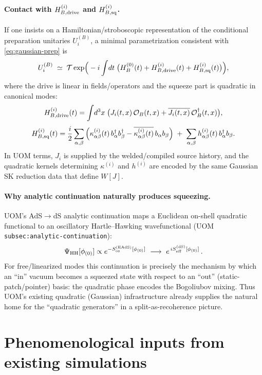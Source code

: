 \documentclass[11pt]{article}
\theoremstyle{definition}
\theoremstyle{plain}
\theoremstyle{remark}
\begin{document}
\paragraph{Contact with $H^{(i)}_{B,{\rm drive}}$ and $H^{(i)}_{B,{\rm sq}}$.}
If one insists on a Hamiltonian/stroboscopic representation of the conditional preparation unitaries $U_i^{(B)}$, a
minimal parametrization consistent with \eqref{eq:gaussian-prep} is
\begin{equation}
U_i^{(B)}
\;\simeq\;
\mathcal T\exp\!\Big(-i\int\!dt\;\big(H^{(0)}_B(t)+H^{(i)}_{B,{\rm drive}}(t)+H^{(i)}_{B,{\rm sq}}(t)\big)\Big),
\label{eq:HB-drive-sq}
\end{equation}
where the drive is linear in fields/operators and the squeeze part is quadratic in canonical modes:
\[
H^{(i)}_{B,{\rm drive}}(t)=\int\!d^3x\;\big(J_i(t,x)\,\mathcal O_B(t,x)+\overline{J_i(t,x)}\,\mathcal O_B^\dagger(t,x)\big),
\]
\[
H^{(i)}_{B,{\rm sq}}(t)
=\frac{i}{2}\sum_{\alpha,\beta}\Big(\kappa^{(i)}_{\alpha\beta}(t)\,b_\alpha^\dagger b_\beta^\dagger
-\overline{\kappa^{(i)}_{\alpha\beta}(t)}\,b_\alpha b_\beta\Big)
\;+\;\sum_{\alpha,\beta}h^{(i)}_{\alpha\beta}(t)\,b_\alpha^\dagger b_\beta.
\]
In UOM terms, $J_i$ is supplied by the welded/compiled source history, and the quadratic kernels determining
$\kappa^{(i)}$ and $h^{(i)}$ are encoded by the same Gaussian SK reduction data that define $W[J]$.

\paragraph{Why analytic continuation naturally produces squeezing.}
UOM's AdS$\to$dS analytic continuation maps a Euclidean on-shell quadratic functional to an oscillatory Hartle--Hawking
wavefunctional (UOM \texttt{subsec:analytic-continuation}):
\[
\Psi_{\rm HH}[\phi_{(0)}]\propto e^{-S_{\rm os}^{\rm (EAdS)}[\phi_{(0)}]}
\ \longrightarrow\ 
e^{\,i S_{\rm eff}^{\rm (dS)}[\phi_{(0)}]}\,.
\]
For free/linearized modes this continuation is precisely the mechanism by which an ``in'' vacuum becomes a squeezed
state with respect to an ``out'' (static-patch/pointer) basis: the quadratic phase encodes the Bogoliubov mixing.
Thus UOM's existing quadratic (Gaussian) infrastructure already supplies the natural home for the
``quadratic generators'' in a split-as-recoherence picture.

\section{Phenomenological inputs from existing simulations}
\label{sec:phenom}
\end{document}
